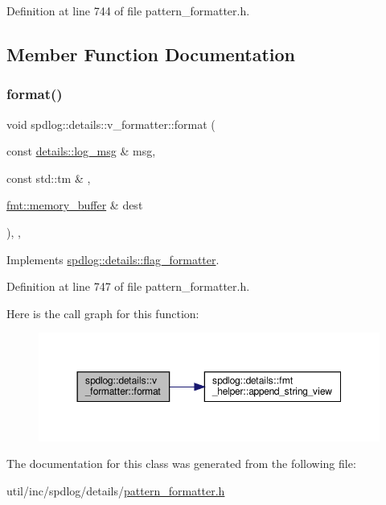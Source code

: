 Definition at line 744 of file pattern\+\_\+formatter.\+h.



\subsection{Member Function Documentation}
\mbox{\label{classspdlog_1_1details_1_1v__formatter_af794a57051f743266fdb6ccf7fd6c61f}} 
\subsubsection{\texorpdfstring{format()}{format()}}
{\footnotesize\ttfamily void spdlog\+::details\+::v\+\_\+formatter\+::format (\begin{DoxyParamCaption}\item[{const \hyperlink{structspdlog_1_1details_1_1log__msg}{details\+::log\+\_\+msg} \&}]{msg,  }\item[{const std\+::tm \&}]{,  }\item[{\hyperlink{format_8h_a21cbf729f69302f578e6db21c5e9e0d2}{fmt\+::memory\+\_\+buffer} \&}]{dest }\end{DoxyParamCaption})\hspace{0.3cm}{\ttfamily [inline]}, {\ttfamily [override]}, {\ttfamily [virtual]}}



Implements \hyperlink{classspdlog_1_1details_1_1flag__formatter_a33fb3e42a4c8200cceb833d92b53fb67}{spdlog\+::details\+::flag\+\_\+formatter}.



Definition at line 747 of file pattern\+\_\+formatter.\+h.

Here is the call graph for this function\+:
\nopagebreak
\begin{figure}[H]
\begin{center}
\leavevmode
\includegraphics[width=350pt]{classspdlog_1_1details_1_1v__formatter_af794a57051f743266fdb6ccf7fd6c61f_cgraph}
\end{center}
\end{figure}


The documentation for this class was generated from the following file\+:\begin{DoxyCompactItemize}
\item 
util/inc/spdlog/details/\hyperlink{pattern__formatter_8h}{pattern\+\_\+formatter.\+h}\end{DoxyCompactItemize}
